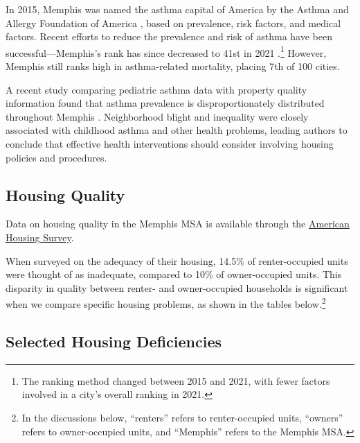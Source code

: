 \documentclass[
]{book}
\begin{document}
In 2015, Memphis was named the asthma capital of America by the Asthma and Allergy Foundation of America \citep{aafa2015}, based on prevalence, risk factors, and medical factors. Recent efforts to reduce the prevalence and risk of asthma have been successful---Memphis's rank has since decreased to 41st in 2021 \citep{aafa2021}.\footnote{The ranking method changed between 2015 and 2021, with fewer factors involved in a city's overall ranking in 2021.} However, Memphis still ranks high in asthma-related mortality, placing 7th of 100 cities.

A recent study comparing pediatric asthma data with property quality information found that asthma prevalence is disproportionately distributed throughout Memphis \citep{shin2018}. Neighborhood blight and inequality were closely associated with childhood asthma and other health problems, leading authors to conclude that effective health interventions should consider involving housing policies and procedures.

\hypertarget{housing-quality}{%
\subsection{Housing Quality}\label{housing-quality}}

Data on housing quality in the Memphis MSA is available through the \href{https://www.census.gov/programs-surveys/ahs.html}{American Housing Survey}.

When surveyed on the adequacy of their housing, 14.5\% of renter-occupied units were thought of as inadequate, compared to 10\% of owner-occupied units. This disparity in quality between renter- and owner-occupied households is significant when we compare specific housing problems, as shown in the tables below.\footnote{In the discussions below, ``renters'' refers to renter-occupied units, ``owners'' refers to owner-occupied units, and ``Memphis'' refers to the Memphis MSA.}

\hypertarget{selected-housing-deficiencies}{%
\subsection{Selected Housing Deficiencies}\label{selected-housing-deficiencies}}
\end{document}
